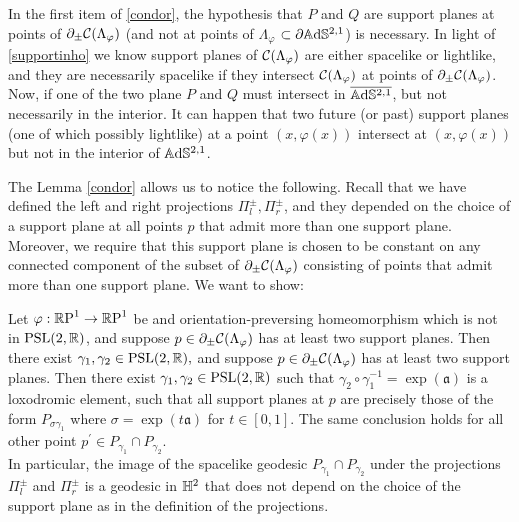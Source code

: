 \begin{observation}
In the first item of \ref{condor}, the hypothesis that $P$ and $Q$ are support planes at points of $\partial_\pm\CF$ (and not at points of $\Lambda_\varphi$ $\subset\partial\A^{2,1}$) is necessary. In light of \ref{supportinho} we know support planes of $\CF$ are either spacelike or lightlike, and they are necessarily spacelike if they intersect $\CF$ at points of $\partial_\pm\CF$. \\
Now, if one of the two plane $P$ and $Q$ must intersect in $\overline{\A^{2,1}}$, but not necessarily in the interior. It can happen that two future (or past) support planes (one of which possibly lightlike) at a point $(x,\varphi(x))$ intersect at $(x,\varphi(x))$ but not in the interior of $\A^{2,1}$.
\end{observation}
 
The Lemma \ref{condor} allows us to notice the following. Recall that we have defined the left and right projections $\Pi_l^\pm, \Pi_r^\pm$, and they depended on the choice of a support plane at all points $p$ that admit more than one support plane. Moreover, we require that this support plane is chosen to be constant on any connected component of the subset of $\partial_\pm\CF$ consisting of points that admit more than one support plane. We want to show:

\begin{corollary}
    Let $\varphi:\S\to\S$ be and orientation-preversing homeomorphism which is not in $\PSL$, and suppose $p\in \partial_\pm\CF$ has at least two support planes. Then there exist $\gamma_1,\gamma_2\in \PSL,$ and suppose $p\in\partial_\pm\CF$ has at least two support planes. Then there exist $\gamma_1,\gamma_2\in\PSL$ such that $\gamma_2\circ\gamma_1^{-1}=\exp(\mathfrak{a})$ is a loxodromic element, such that all support planes at $p$ are precisely those of the form $P_{\sigma\gamma_1}$ where $\sigma=\exp(t\mathfrak{a})$ for $t\in [0,1].$ The same conclusion holds for all other point $p^{\prime}\in P_{\gamma_1}\cap P_{\gamma_2}$. \\
    In particular, the image of the spacelike geodesic $P_{\gamma_1}\cap P_{\gamma_2}$ under the projections $\Pi_l^\pm$ and $\Pi_r^\pm$ is a geodesic in $\H^2$ that does not depend on the choice of the support plane as in the definition of the projections.  
\end{corollary}

